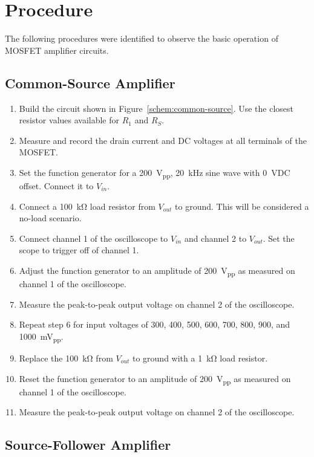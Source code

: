 \section{Procedure}
\label{sec:procedure}

The following procedures were identified to observe the basic operation of MOSFET amplifier circuits.

\subsection{Common-Source Amplifier}

\begin{enumerate}
\item Build the circuit shown in Figure~\ref{schem:common-source}.  Use the closest resistor values available for $R_1$ and $R_S$.
\item Measure and record the drain current and DC voltages at all terminals of the MOSFET.
\item Set the function generator for a \SI{200}{V_{pp}}, \SI{20}{kHz} sine wave with \SI{0}{VDC} offset.  Connect it to $V_{in}$.
\item Connect a \SI{100}{\kilo\ohm} load resistor from $V_{out}$ to ground.  This will be considered a no-load scenario.
\item Connect channel 1 of the oscilloscope to $V_{in}$ and channel 2 to $V_{out}$.  Set the scope to trigger off of channel 1.
\item Adjust the function generator to an amplitude of \SI{200}{V_{pp}} as measured on channel 1 of the oscilloscope.
\item Measure the peak-to-peak output voltage on channel 2 of the oscilloscope.
\item Repeat step 6 for input voltages of 300, 400, 500, 600, 700, 800, 900, and \SI{1000}{mV_{pp}}.
\item Replace the \SI{100}{\kilo\ohm} from $V_{out}$ to ground with a \SI{1}{\kilo\ohm} load resistor.
\item Reset the function generator to an amplitude of \SI{200}{V_{pp}} as measured on channel 1 of the oscilloscope.
\item Measure the peak-to-peak output voltage on channel 2 of the oscilloscope.
\end{enumerate}

\subsection{Source-Follower Amplifier}

